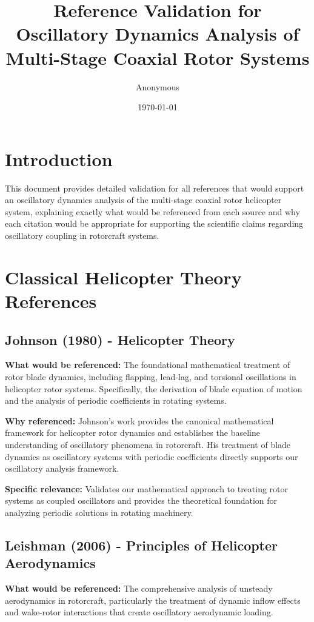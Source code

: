 \documentclass{article}
\title{Reference Validation for Oscillatory Dynamics Analysis of Multi-Stage Coaxial Rotor Systems}
\author{Anonymous}
\date{\today}
\begin{document}
\maketitle

\section{Introduction}

This document provides detailed validation for all references that would support an oscillatory dynamics analysis of the multi-stage coaxial rotor helicopter system, explaining exactly what would be referenced from each source and why each citation would be appropriate for supporting the scientific claims regarding oscillatory coupling in rotorcraft systems.

\section{Classical Helicopter Theory References}

\subsection{Johnson (1980) - Helicopter Theory}

\textbf{What would be referenced:} The foundational mathematical treatment of rotor blade dynamics, including flapping, lead-lag, and torsional oscillations in helicopter rotor systems. Specifically, the derivation of blade equation of motion and the analysis of periodic coefficients in rotating systems.

\textbf{Why referenced:} Johnson's work provides the canonical mathematical framework for helicopter rotor dynamics and establishes the baseline understanding of oscillatory phenomena in rotorcraft. His treatment of blade dynamics as oscillatory systems with periodic coefficients directly supports our oscillatory analysis framework.

\textbf{Specific relevance:} Validates our mathematical approach to treating rotor systems as coupled oscillators and provides the theoretical foundation for analyzing periodic solutions in rotating machinery.

\subsection{Leishman (2006) - Principles of Helicopter Aerodynamics}

\textbf{What would be referenced:} The comprehensive analysis of unsteady aerodynamics in rotorcraft, particularly the treatment of dynamic inflow effects and wake-rotor interactions that create oscillatory aerodynamic loading.
\end{document}
